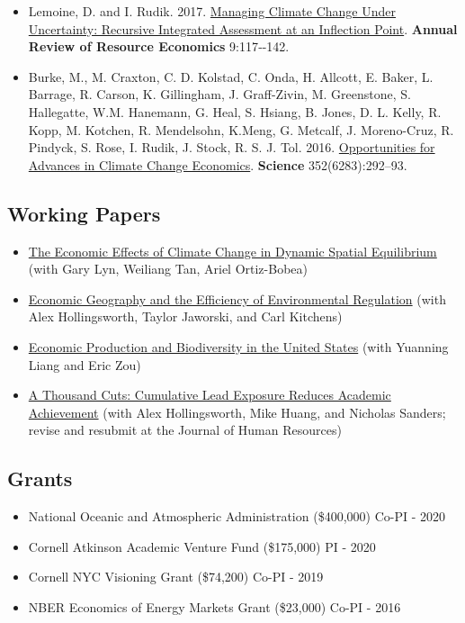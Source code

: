 \documentclass[11pt]{res} %
\begin{document}
\begin{resume}
\begin{itemize}
\begin{itemize}
	\end{itemize}
	\item[] Lemoine, D. and I. Rudik. 2017. \href{https://papers.ssrn.com/sol3/papers.cfm?abstract_id=2862211}{Managing Climate Change Under Uncertainty: Recursive Integrated Assessment at an Inflection Point}.  \textbf{Annual Review of Resource Economics} 9:117‐-142.
	\item[]  Burke, M., M. Craxton, C. D. Kolstad, C. Onda, H. Allcott, E. Baker, L. Barrage, R. Carson, K. Gillingham, J. Graff-Zivin, M. Greenstone, S. Hallegatte, W.M. Hanemann, G. Heal, S. Hsiang, B. Jones, D. L. Kelly, R. Kopp, M. Kotchen, R. Mendelsohn, K.Meng, G. Metcalf, J. Moreno-Cruz, R. Pindyck, S. Rose, I. Rudik, J. Stock, R. S. J. Tol. 2016. \href{http://science.sciencemag.org/content/352/6283/292.abstract}{Opportunities for Advances in Climate Change Economics}. \textbf{Science} 352(6283):292--93.
\end{itemize} 


\vspace{-.2in}


\subsection{Working Papers}

\begin{itemize} %
	\item[] \href{https://osf.io/preprints/socarxiv/usghb}{The Economic Effects of Climate Change in Dynamic Spatial Equilibrium} (with Gary Lyn, Weiliang Tan, Ariel Ortiz-Bobea)
	\item[]\href{https://ivanrudik.com}{Economic Geography and the Efficiency of Environmental Regulation} (with Alex Hollingsworth, Taylor Jaworski, and Carl Kitchens)
	\item[] \href{https://osf.io/preprints/socarxiv/qy76a}{Economic Production and Biodiversity in the United States} (with Yuanning Liang and Eric Zou)
	\item[] \href{https://www.nber.org/papers/w28250}{A Thousand Cuts: Cumulative Lead Exposure Reduces Academic Achievement} (with Alex Hollingsworth, Mike Huang, and Nicholas Sanders; revise and resubmit at the Journal of Human Resources)
\end{itemize}

\vspace{-.2in}

\subsection{Grants}
\begin{itemize}  \itemsep -1pt
	\item[] National Oceanic and Atmospheric Administration (\$400,000) \hfill Co-PI - 2020
	\item[] Cornell Atkinson Academic Venture Fund (\$175,000) \hfill PI - 2020
	\item[] Cornell NYC Visioning Grant (\$74,200) \hfill Co-PI - 2019
	\item[] NBER Economics of Energy Markets Grant (\$23,000) \hfill Co-PI - 2016
\end{itemize}


\end{resume}
\end{document}
